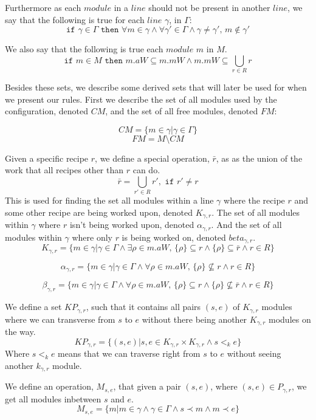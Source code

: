 Furthermore as each $module$ in a $line$ should not be present in another $line$, we say that the following is true for each $line$ $\gamma$, in $\Gamma$:
\[\texttt{if } \gamma \in \Gamma \texttt{ then } \forall m \in \gamma \land \forall \gamma ' \in \Gamma \land \gamma \neq \gamma ',\, m \notin \gamma ' \]

We also say that the following is true each $module$ $m$ in $M$.
\[\texttt{if } m \in M \texttt{ then } m.aW \subseteq m.mW \land m.mW \subseteq  \bigcup_{r\in R}r\] 


Besides these sets, we describe some derived sets that will later be used for when we present our rules. First we describe the set of all modules used by the configuration, denoted $CM$, and the set of all free modules, denoted $FM$:


\[CM = \{m \in \gamma | \gamma \in \Gamma \}\]
\[FM = M \setminus CM \]

Given a specific recipe $r$, we define a special operation, $\bar{r}$, as as the union of the work that all recipes other than $r$ can do. 
\[\bar{r} = \bigcup_{r' \in R}r', \texttt{ if } r' \neq r\]
This is used for finding the set all modules within a line $\gamma$ where the recipe $r$ and some other recipe are being worked upon, denoted $K_{\gamma ,r}$. The set of all modules within $\gamma$ where $r$ isn't being worked upon, denoted $\alpha_{\gamma ,r}$. And the set of all modules within $\gamma$ where only $r$ is being worked on, denoted $beta_{\gamma ,r}$. 
\[K_{\gamma ,r} = \{m \in \gamma | \gamma \in \Gamma \land \exists \rho \in m.aW,\, \{\rho\} \subseteq r \land \{\rho\} \subseteq \bar{r} \land r \in R\}\]

\[\alpha_{\gamma ,r}  = \{m \in \gamma | \gamma \in \Gamma \land \forall \rho \in m.aW,\, \{\rho\} \nsubseteq r \land r \in R\}\]

\[\beta_{\gamma ,r}  = \{m \in \gamma | \gamma \in \Gamma \land \forall \rho \in m.aW,\, \{\rho\} \subseteq r \land \{\rho\} \nsubseteq \bar{r} \land r \in R\}\]


We define a set $KP_{\gamma ,r}$, such that it contains all pairs $(s, e)$ of $K_{\gamma ,r}$ modules where we can transverse from $s$ to $e$ without there being another $K_{\gamma, r}$ modules on the way.
\[KP_{\gamma ,r} = \{(s, e)| {s, e} \in K_{\gamma ,r} \times K_{\gamma ,r} \land s <_k  e\}\]
Where $s <_k e$ means that we can traverse right from $s$ to $e$ without seeing another $k_{\gamma, r}$ module. 

We define an operation, $M_{s,e}$, that given a pair $(s, e)$, where $(s, e) \in P_{\gamma ,r}$, we get all modules inbetween $s$ and $e$.
\[M_{s,e} = \{m | m \in \gamma \land \gamma \in \Gamma \land s \prec m \land m \prec e\}\]

